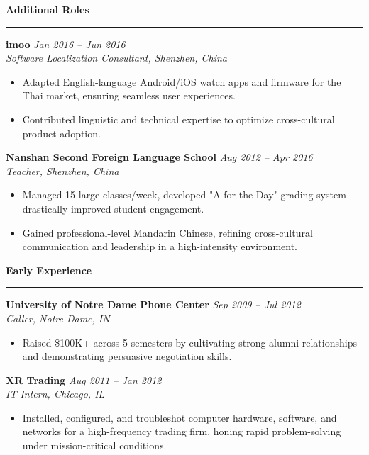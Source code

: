 \documentclass[letterpaper,10pt]{article}
\newcommand{\resheading}[1]{
  \vspace{15pt}
  \textbf{\large #1}
  \vspace{5pt}
  \hrule
  \vspace{10pt}
}
\begin{document}
\resheading{Additional Roles}
\textbf{imoo} \hfill \textit{Jan 2016 -- Jun 2016}\\
\emph{Software Localization Consultant, Shenzhen, China}
\begin{itemize}
  \item Adapted English-language Android/iOS watch apps and firmware for the Thai market, ensuring seamless user experiences.
  \item Contributed linguistic and technical expertise to optimize cross-cultural product adoption.
\end{itemize}

\textbf{Nanshan Second Foreign Language School} \hfill \textit{Aug 2012 -- Apr 2016}\\
\emph{Teacher, Shenzhen, China}\\
\begin{itemize}
  \item Managed 15 large classes/week, developed "A for the Day" grading system—drastically improved student engagement.
  \item Gained professional-level Mandarin Chinese, refining cross-cultural communication and leadership in a high-intensity environment.
\end{itemize}

\resheading{Early Experience}
\textbf{University of Notre Dame Phone Center} \hfill \textit{Sep 2009 -- Jul 2012}\\
\emph{Caller, Notre Dame, IN}\\
\begin{itemize}
  \item Raised \$100K+ across 5 semesters by cultivating strong alumni relationships and demonstrating persuasive negotiation skills.
\end{itemize}

\textbf{XR Trading} \hfill \textit{Aug 2011 -- Jan 2012}\\
\emph{IT Intern, Chicago, IL}\\
\begin{itemize}
  \item Installed, configured, and troubleshot computer hardware, software, and networks for a high-frequency trading firm, honing rapid problem-solving under mission-critical conditions.
\end{itemize}

\end{document}
